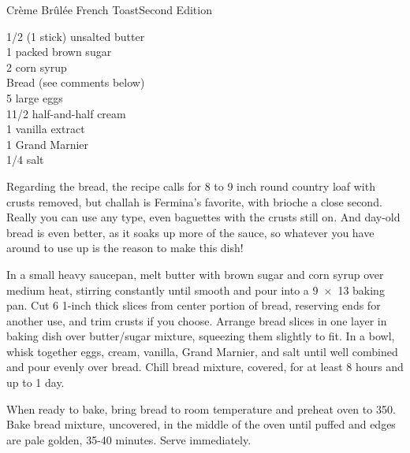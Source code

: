 \begin{entry}{Cr\`eme Br\^ul\'ee French Toast}{Second Edition}

\begin{open}

\end{open}
\begin{ingredients}
    \SI{1/2}{\cup} (1 stick) unsalted butter \\
    \SI{1}{\cup} packed brown sugar \\
    \SI{2}{\tblspoon} corn syrup \\
    Bread (see comments below)\\
    5 large eggs\\
    1\SI{1/2}{\cup} half-and-half cream \\
    \SI{1}{\teaspoon} vanilla extract \\
    \SI{1}{\teaspoon} Grand Marnier \\
    \SI{1/4}{\teaspoon} salt
\end{ingredients}
Regarding the bread, the recipe calls for 8 to 9 inch round country loaf with
crusts removed, but challah is Fermina's favorite, with brioche a close
second. Really you can use any type, even baguettes with the crusts still
on. And day-old bread is even better, as it soaks up more of the sauce, so
whatever you have around to use up is the reason to make this dish!

In a small heavy saucepan, melt butter with brown sugar and corn syrup over
medium heat, stirring constantly until smooth and pour into a \SI{9x13}{\inch}
baking pan. Cut 6 1-inch thick slices from center portion of bread, reserving
ends for another use, and trim crusts if you choose. Arrange bread slices in
one layer in baking dish over butter/sugar mixture, squeezing them slightly to
fit. In a bowl, whisk together eggs, cream, vanilla, Grand Marnier, and salt
until well combined and pour evenly over bread. Chill bread mixture, covered,
for at least 8 hours and up to 1 day.

When ready to bake, bring bread to room temperature and preheat oven to
\SI{350}{\degreeF}. Bake bread mixture, uncovered, in the middle of the oven
until puffed and edges are pale golden, 35-40 minutes. Serve immediately.
\end{entry}


